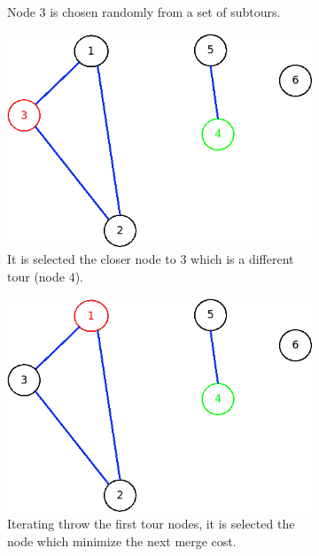 \begin{figure}[!h]
\begin{subfigure}{.26\columnwidth}
		\caption{Node $ 3 $ is chosen randomly from a set of subtours.}
		\label{fig:patching2}
	\end{subfigure}
\hfill%
	\begin{subfigure}{.26\columnwidth}
		\includegraphics[width=\columnwidth]{img/patching3.png}
		\caption{It is selected the closer node to $ 3 $ which is a different tour (node $ 4 $).}
		\label{fig:patching3}
	\end{subfigure}
	\begin{subfigure}{.26\columnwidth}
		\includegraphics[width=\columnwidth]{img/patching4.png}
		\caption{Iterating throw the first tour nodes, it is selected the node which minimize the next merge cost.}
		\label{fig:patching4}
	\end{subfigure}
\hfill%
	\begin{subfigure}{.26\columnwidth}

\end{subfigure}
\end{figure}

